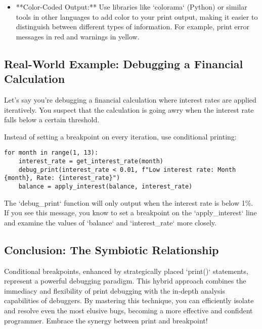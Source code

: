 \documentclass{article}
\begin{document}
{{{\begin{itemize}
\begin{verbatim}
def debug_print(condition, message):
    if condition:
        print(message)

for i, data in enumerate(data_list):
    debug_print(data['value1'] > 8, f"Potential issue: Iteration {i}, Value1: {data['value1']}")
\end{verbatim}

    \item **Color-Coded Output:**  Use libraries like `colorama` (Python) or similar tools in other languages to add color to your print output, making it easier to distinguish between different types of information.  For example, print error messages in red and warnings in yellow.
\end{itemize}

\subsection*{Real-World Example: Debugging a Financial Calculation}

Let's say you're debugging a financial calculation where interest rates are applied iteratively.  You suspect that the calculation is going awry when the interest rate falls below a certain threshold.

Instead of setting a breakpoint on every iteration, use conditional printing:

\begin{verbatim}
for month in range(1, 13):
    interest_rate = get_interest_rate(month)
    debug_print(interest_rate < 0.01, f"Low interest rate: Month {month}, Rate: {interest_rate}")
    balance = apply_interest(balance, interest_rate)
\end{verbatim}

The `debug_print` function will only output when the interest rate is below 1\%. If you see this message, you know to set a breakpoint on the `apply_interest` line and examine the values of `balance` and `interest_rate` more closely.

\subsection*{Conclusion: The Symbiotic Relationship}

Conditional breakpoints, enhanced by strategically placed `print()` statements, represent a powerful debugging paradigm. This hybrid approach combines the immediacy and flexibility of print debugging with the in-depth analysis capabilities of debuggers. By mastering this technique, you can efficiently isolate and resolve even the most elusive bugs, becoming a more effective and confident programmer. Embrace the synergy between print and breakpoint!

}}}
\end{document}
